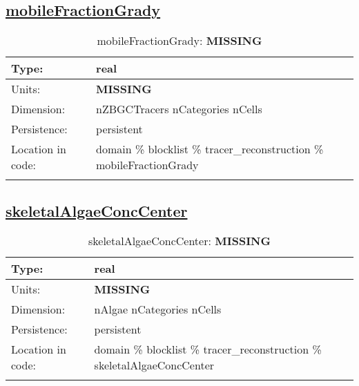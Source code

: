 \subsection[mobileFractionGrady]{\hyperref[sec:var_tab_tracer_reconstruction]{mobileFractionGrady}}
\label{subsec:var_sec_tracer_reconstruction_mobileFractionGrady}
\begin{center}
\begin{longtable}{| p{2.0in} | p{4.0in} |}
        \hline 
        Type: & real \\
        \hline 
        Units: & {\bf \color{red} MISSING} \\
        \hline 
        Dimension: & nZBGCTracers nCategories nCells \\
        \hline 
        Persistence: & persistent \\
        \hline 
         Location in code: & domain \% blocklist \% tracer\_reconstruction \% mobileFractionGrady \\
         \hline 
    \caption{mobileFractionGrady: {\bf \color{red} MISSING}}
\end{longtable}
\end{center}
\subsection[skeletalAlgaeConcCenter]{\hyperref[sec:var_tab_tracer_reconstruction]{skeletalAlgaeConcCenter}}
\label{subsec:var_sec_tracer_reconstruction_skeletalAlgaeConcCenter}
\begin{center}
\begin{longtable}{| p{2.0in} | p{4.0in} |}
        \hline 
        Type: & real \\
        \hline 
        Units: & {\bf \color{red} MISSING} \\
        \hline 
        Dimension: & nAlgae nCategories nCells \\
        \hline 
        Persistence: & persistent \\
        \hline 
         Location in code: & domain \% blocklist \% tracer\_reconstruction \% skeletalAlgaeConcCenter \\
         \hline 
    \caption{skeletalAlgaeConcCenter: {\bf \color{red} MISSING}}
\end{longtable}
\end{center}
